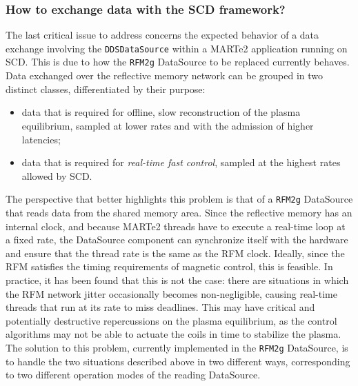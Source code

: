 \subsubsection{How to exchange data with the SCD framework?}
\label{sec:ddsdatasource_marte2}
The last critical issue to address concerns the expected behavior of a data exchange involving the \texttt{DDSDataSource} within a MARTe2 application running on SCD. This is due to how the \texttt{RFM2g} DataSource to be replaced currently behaves. Data exchanged over the reflective memory network can be grouped in two distinct classes, differentiated by their purpose:
\begin{itemize}
  \item data that is required for offline, slow reconstruction of the plasma equilibrium, sampled at lower rates and with the admission of higher latencies;
  \item data that is required for \emph{real-time fast control}, sampled at the highest rates allowed by SCD.
\end{itemize}
The perspective that better highlights this problem is that of a \texttt{RFM2g} DataSource that reads data from the shared memory area. Since the reflective memory has an internal clock, and because MARTe2 threads have to execute a real-time loop at a fixed rate, the DataSource component can synchronize itself with the hardware and ensure that the thread rate is the same as the RFM clock. Ideally, since the RFM satisfies the timing requirements of magnetic control, this is feasible. In practice, it has been found that this is not the case: there are situations in which the RFM network jitter occasionally becomes non-negligible, causing real-time threads that run at its rate to miss deadlines. This may have critical and potentially destructive repercussions on the plasma equilibrium, as the control algorithms may not be able to actuate the coils in time to stabilize the plasma. The solution to this problem, currently implemented in the \texttt{RFM2g} DataSource, is to handle the two situations described above in two different ways, corresponding to two different operation modes of the reading DataSource.
